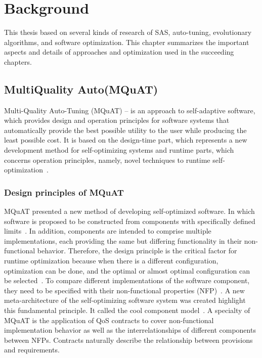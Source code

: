\chapter{Background}
This thesis  based on several kinds of research of SAS, auto-tuning, evolutionary algorithms, and software optimization. This chapter summarizes the important aspects and details of approaches and optimization  used in the succeeding chapters. 

\section{Multi\rev{-}Quality Auto(MQuAT)}
Multi-Quality Auto-Tuning (MQuAT) – is an approach to self-adaptive software, which provides design and operation principles for software systems that automatically provide the best possible utility to the user while producing the least possible cost.
It is based on the design-time part, which represents a new development method for self-optimizing systems and runtime parts, which concerns operation principles, namely,  novel techniques to runtime self-optimization~\cite{gotz13}.

\subsection{Design principles of MQuAT}
MQuAT presented a new method of developing self-optimized software. In which software is proposed to be constructed from components with specifically defined limits~. In addition, components are intended to comprise multiple implementations, each providing the same but differing functionality in their non-functional behavior. Therefore, the design principle is the critical factor for runtime optimization because when there is a different configuration, optimization can be done, and the optimal or almost optimal configuration can be selected~. To compare different implementations of the software component, they need to be specified with their non-functional properties (NFP)~\cite{gotz13}.
A new meta-architecture of the self-optimizing software system was created  highlight this fundamental principle. It called the cool component model~\cite{gotz10}.
A specialty of MQuAT is the application of QoS contracts to cover non-functional implementation behavior as well as the interrelationships of different components between NFPs. Contracts naturally describe the relationship between provisions and requirements.

